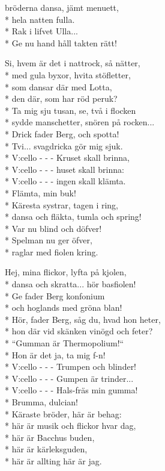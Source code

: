 \begin{SongText}
\begin{SongVerse}
bröderna dansa, jämt menuett,\\*%
hela natten fulla.\\*%
Rak i lifvet Ulla...\\*%
Ge nu hand håll takten rätt!
\end{SongVerse}
\begin{SongVerse}
Si, hvem är det i nattrock, så nätter,\\*%
med gula byxor, hvita stöfletter,\\*%
som dansar där med Lotta,\\*%
den där, som har röd peruk?\\*%
Ta mig sju tusan, se, två i flocken\\*%
sydde manschetter, snören på rocken...\\*%
Drick fader Berg, och spotta!\\*%
Tvi... svagdricka gör mig sjuk.\\*%
V:cello - - - Kruset skall brinna,\\*%
V:cello - - - huset skall brinna:\\*%
V:cello - - - ingen skall klämta.\\*%
Flämta, min buk!\\*%
Käresta systrar, tagen i ring,\\*%
dansa och fläkta, tumla och spring!\\*%
Var nu blind och döfver!\\*%
Spelman nu ger öfver,\\*%
raglar med fiolen kring.
\end{SongVerse}
\begin{SongVerse}
Hej, mina flickor, lyfta på kjolen,\\*%
dansa och skratta... hör basfiolen!\\*%
Ge fader Berg konfonium\\*%
och hoglands med gröna blan!\\*%
Hör, fader Berg, såg du, hvad hon heter,\\*%
hon där vid skänken vinögd och feter?\\*%
“Gumman är Thermopolium!“\\*%
Hon är det ja, ta mig f-n!\\*%
V:cello - - - Trumpen och blinder!\\*%
V:cello - - - Gumpen är trinder...\\*%
V:cello - - - Hals-fräs min gumma!\\*%
Brumma, dulcian!\\*%
Käraste bröder, här är behag:\\*%
här är musik och flickor hvar dag,\\*%
här är Bacchus buden,\\*%
här är kärleksguden,\\*%
här är allting här är jag. 
\end{SongVerse}
\end{SongText}
